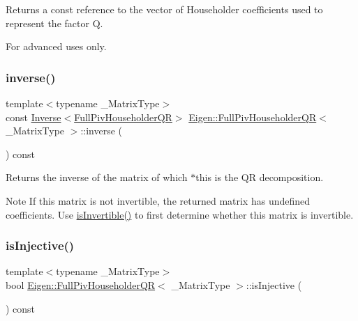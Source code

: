 \begin{DoxyReturn}{Returns}
a const reference to the vector of Householder coefficients used to represent the factor {\ttfamily Q}.
\end{DoxyReturn}
For advanced uses only. \mbox{\label{class_eigen_1_1_full_piv_householder_q_r_a352ce66397af06da214ddde343cec6f5}} 
\subsubsection{\texorpdfstring{inverse()}{inverse()}}
{\footnotesize\ttfamily template$<$typename \+\_\+\+Matrix\+Type$>$ \\
const \mbox{\hyperlink{class_eigen_1_1_inverse}{Inverse}}$<$\mbox{\hyperlink{class_eigen_1_1_full_piv_householder_q_r}{Full\+Piv\+Householder\+QR}}$>$ \mbox{\hyperlink{class_eigen_1_1_full_piv_householder_q_r}{Eigen\+::\+Full\+Piv\+Householder\+QR}}$<$ \+\_\+\+Matrix\+Type $>$\+::inverse (\begin{DoxyParamCaption}{ }\end{DoxyParamCaption}) const\hspace{0.3cm}{\ttfamily [inline]}}

\begin{DoxyReturn}{Returns}
the inverse of the matrix of which $\ast$this is the QR decomposition.
\end{DoxyReturn}
\begin{DoxyNote}{Note}
If this matrix is not invertible, the returned matrix has undefined coefficients. Use \mbox{\hyperlink{class_eigen_1_1_full_piv_householder_q_r_aeb1d779ec22ec68a5a28d4235db02ec1}{is\+Invertible()}} to first determine whether this matrix is invertible. 
\end{DoxyNote}
\mbox{\label{class_eigen_1_1_full_piv_householder_q_r_a6776788011026b0f63192485a59deaed}} 
\subsubsection{\texorpdfstring{isInjective()}{isInjective()}}
{\footnotesize\ttfamily template$<$typename \+\_\+\+Matrix\+Type$>$ \\
bool \mbox{\hyperlink{class_eigen_1_1_full_piv_householder_q_r}{Eigen\+::\+Full\+Piv\+Householder\+QR}}$<$ \+\_\+\+Matrix\+Type $>$\+::is\+Injective (\begin{DoxyParamCaption}{ }\end{DoxyParamCaption}) const\hspace{0.3cm}{\ttfamily [inline]}}

